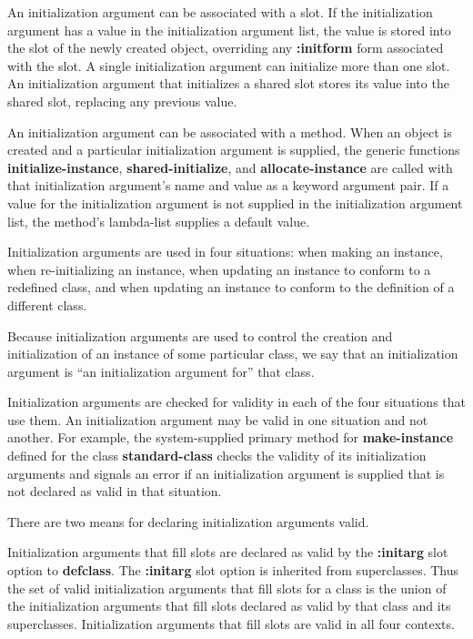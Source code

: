 An initialization argument can be associated with a slot.  If the
initialization argument has a value in the initialization argument
list, the value is stored into the slot of the newly created object,
overriding any {\bf :initform} form associated with the slot.  A
single initialization argument can initialize more than one slot.  An
initialization argument that initializes a shared slot stores its
value into the shared slot, replacing any previous value.

An initialization argument can be associated with a method.  When an
object is created and a particular initialization argument is
supplied, the generic functions {\bf initialize-instance}, {\bf
shared-initialize}, and {\bf allocate-instance} are called with that
initialization argument's name and value as a keyword argument pair.
If a value for the initialization argument is not supplied in the
initialization argument list, the method's lambda-list supplies a
default value.

Initialization arguments are used in four situations: when making an
instance, when re-initializing an instance, when updating an instance to
conform to a redefined class, and when updating an instance to conform
to the definition of a different class.

Because initialization arguments are used to control the creation and
initialization of an instance of some particular class, we say that an
initialization argument is ``an initialization argument for'' that
class.

\endsubSection%


Initialization arguments are checked for validity in each of the four
situations that use them.  An initialization argument may be valid in
one situation and not another. For example, the system-supplied
primary method for {\bf make-instance} defined for the class {\bf
standard-class} checks the validity of its initialization arguments
and signals an error if an initialization argument is supplied that is
not declared as valid in that situation.

\newpage

There are two means for declaring initialization arguments valid.

\beginlist

\item{\bull} Initialization arguments that fill slots are declared as
valid by the {\bf :initarg} slot option to {\bf defclass}.  The {\bf
:initarg} slot option is inherited from superclasses.  Thus the set of
valid initialization arguments that fill slots for a class is the
union of the initialization arguments that fill slots declared as
valid by that class and its superclasses. Initialization arguments
that fill slots are valid in all four contexts.

